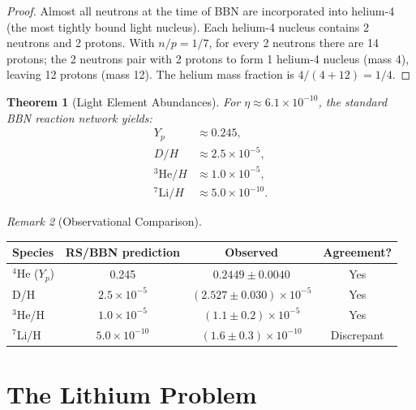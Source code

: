 \documentclass[12pt,a4paper]{article}
\newtheorem{theorem}{Theorem}[section]
\theoremstyle{definition}
\theoremstyle{remark}
\newtheorem{remark}[theorem]{Remark}
\begin{document}
\begin{proof}
Almost all neutrons at the time of BBN are incorporated into
helium-4 (the most tightly bound light nucleus).  Each helium-4
nucleus contains 2 neutrons and 2 protons.  With $n/p = 1/7$,
for every 2 neutrons there are 14 protons; the 2 neutrons pair
with 2 protons to form 1 helium-4 nucleus (mass 4), leaving 12
protons (mass 12).  The helium mass fraction is $4/(4 + 12) = 1/4$.
\end{proof}

\begin{theorem}[Light Element Abundances]
For $\eta \approx 6.1 \times 10^{-10}$, the standard BBN reaction
network yields:
\begin{align}
  Y_p &\approx 0.245, \\
  D/H &\approx 2.5 \times 10^{-5}, \\
  {}^3\mathrm{He}/H &\approx 1.0 \times 10^{-5}, \\
  {}^7\mathrm{Li}/H &\approx 5.0 \times 10^{-10}.
\end{align}
\end{theorem}

\begin{remark}[Observational Comparison]~

\medskip
\begin{center}
\renewcommand{\arraystretch}{1.3}
\begin{tabular}{@{}lccc@{}}
\toprule
\textbf{Species} & \textbf{RS/BBN prediction} &
\textbf{Observed} & \textbf{Agreement?} \\
\midrule
${}^4$He ($Y_p$) & 0.245 & $0.2449 \pm 0.0040$ & Yes \\
D/H & $2.5 \times 10^{-5}$ & $(2.527 \pm 0.030) \times 10^{-5}$
& Yes \\
${}^3$He/H & $1.0 \times 10^{-5}$ & $(1.1 \pm 0.2) \times 10^{-5}$
& Yes \\
${}^7$Li/H & $5.0 \times 10^{-10}$ &
$(1.6 \pm 0.3) \times 10^{-10}$ & Discrepant \\
\bottomrule
\end{tabular}
\end{center}
\end{remark}

\section{The Lithium Problem}
\label{sec:lithium}
\end{document}
